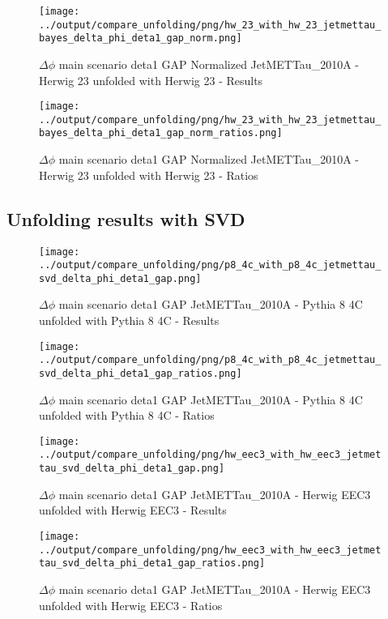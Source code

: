 \documentclass[11pt]{book}
\begin{document}
\begin{figure}[ht]
\centering
\texttt{[image: ../output/compare\_unfolding/png/hw\_23\_with\_hw\_23\_jetmettau\_bayes\_delta\_phi\_deta1\_gap\_norm.png]}
\caption{$\Delta\phi$ main scenario deta1 GAP Normalized JetMETTau\_2010A - Herwig 23 unfolded with Herwig 23 - Results}
\label{hw_23_hw_23_jetmettau_bayes_delta_phi_deta1_gap_norm_a}
\end{figure}

\begin{figure}[ht]
\centering
\texttt{[image: ../output/compare\_unfolding/png/hw\_23\_with\_hw\_23\_jetmettau\_bayes\_delta\_phi\_deta1\_gap\_norm\_ratios.png]}
\caption{$\Delta\phi$ main scenario deta1 GAP Normalized JetMETTau\_2010A - Herwig 23 unfolded with Herwig 23 - Ratios}
\label{hw_23_hw_23_jetmettau_bayes_delta_phi_deta1_gap_norm_b}
\end{figure}


\clearpage
\subsection{Unfolding results with SVD}

\begin{figure}[ht]
\centering
\texttt{[image: ../output/compare\_unfolding/png/p8\_4c\_with\_p8\_4c\_jetmettau\_svd\_delta\_phi\_deta1\_gap.png]}
\caption{$\Delta\phi$ main scenario deta1 GAP JetMETTau\_2010A - Pythia 8 4C unfolded with Pythia 8 4C - Results}
\label{p8_p8_jetmettau_svd_delta_phi_deta1_gap_a}
\end{figure}

\begin{figure}[ht]
\centering
\texttt{[image: ../output/compare\_unfolding/png/p8\_4c\_with\_p8\_4c\_jetmettau\_svd\_delta\_phi\_deta1\_gap\_ratios.png]}
\caption{$\Delta\phi$ main scenario deta1 GAP JetMETTau\_2010A - Pythia 8 4C unfolded with Pythia 8 4C - Ratios}
\label{p8_p8_jetmettau_svd_delta_phi_deta1_gap_b}
\end{figure}

\begin{figure}[ht]
\centering
\texttt{[image: ../output/compare\_unfolding/png/hw\_eec3\_with\_hw\_eec3\_jetmettau\_svd\_delta\_phi\_deta1\_gap.png]}
\caption{$\Delta\phi$ main scenario deta1 GAP JetMETTau\_2010A - Herwig EEC3 unfolded with Herwig EEC3 - Results}
\label{hw_eec3_hw_eec3_jetmettau_svd_delta_phi_deta1_gap_a}
\end{figure}

\begin{figure}[ht]
\centering
\texttt{[image: ../output/compare\_unfolding/png/hw\_eec3\_with\_hw\_eec3\_jetmettau\_svd\_delta\_phi\_deta1\_gap\_ratios.png]}
\caption{$\Delta\phi$ main scenario deta1 GAP JetMETTau\_2010A - Herwig EEC3 unfolded with Herwig EEC3 - Ratios}
\label{hw_eec3_hw_eec3_jetmettau_svd_delta_phi_deta1_gap_b}
\end{figure}
\end{document}

